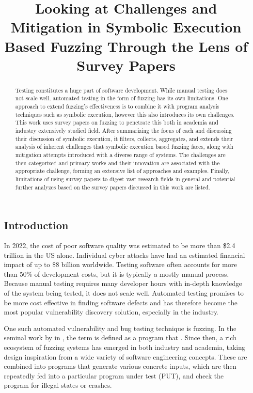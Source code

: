 \documentclass{article}
\title{Looking at Challenges and Mitigation in Symbolic Execution Based Fuzzing Through the Lens of Survey Papers}
\begin{document}


\maketitle
\begin{multicols}{2}
    \begin{abstract}
        Testing constitutes a huge part of software development. While manual testing does not scale well, automated testing in the form of fuzzing has its own limitations. One approach to extend fuzzing's effectiveness is to combine it with program analysis techniques such as symbolic execution, however this also introduces its own challenges. %
        This work uses survey papers on fuzzing to penetrate this both in academia and industry extensively studied field. After summarizing the focus of each and discussing their discussion of symbolic execution, it filters, collects, aggregates, and extends their analysis of inherent challenges that symbolic execution based fuzzing faces, along with mitigation attempts introduced with a diverse range of systems. The challenges are then categorized and primary works and their innovation are associated with the appropriate challenge, forming an extensive list of approaches and examples. %
        Finally, limitations of using survey papers to digest vast research fields in general and potential further analyzes based on the survey papers discussed in this work are listed.
    \end{abstract}

    \section{Introduction}
    In 2022, the cost of poor software quality was estimated to be more than \$2.4 trillion in the US alone.\cite{CostPoorSoftware} Individual cyber attacks have had an estimated financial impact of up to \$8 billion worldwide.\cite{Demystifying} Testing software often accounts for more than 50\% of development costs\cite{Orchestrated}, but it is typically a mostly manual process\cite{PreliminaryAssessment}. Because manual testing requires many developer hours with in-depth knowledge of the system being tested, it does not scale well. Automated testing promises to be more cost effective in finding software defects and has therefore become the most popular vulnerability discovery solution, especially in the industry.\cite{FuzzingASurvey}

    One such automated vulnerability and bug testing technique is fuzzing.\cite{VulnerabilityDiscoveryTechniques} In the seminal work by \citeauthor{UNIX} in \citeyear{UNIX}, the term  is defined as a program that \cite{UNIX}. Since then, a rich ecosystem of fuzzing systems has emerged in both industry and academia, taking design inspiration from a wide variety of software engineering concepts. These are combined into programs that generate various concrete inputs, which are then repeatedly fed into a particular program under test (PUT), and check the program for illegal states or crashes.\cite{EvaluatingFuzzTesting}


\end{multicols}
\end{document}
